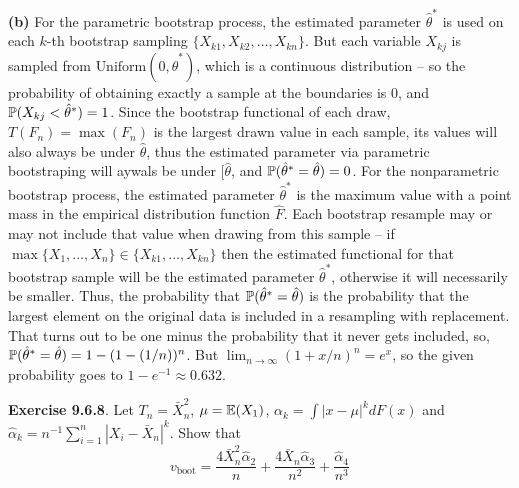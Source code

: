 \textbf{(b)}
For the parametric bootstrap process, the estimated parameter
\(\hat{\theta}^{*}\) is used on each \(k\)-th bootstrap sampling
\(\{ X_{k1}, X_{k2}, \dots, X_{kn} \}\). But each variable \(X_{kj}\) is
sampled from \(\text{Uniform}(0, \hat{\theta}^{*})\), which is a
continuous distribution -- so the probability of obtaining exactly a
sample at the boundaries is 0, and
\(\operatorname{\mathbb{P}}(X_{kj} < \hat{\theta}^{*}) = 1\). Since the bootstrap
functional of each draw, \(T(F_{n}) = \max(F_{n})\) is the largest drawn
value in each sample, its values will also always be under
\(\hat{\theta}\), thus the estimated parameter via parametric
bootstraping will aywals be under \([\hat{\theta}\), and
\(\operatorname{\mathbb{P}}(\hat{\theta}^{*} = \hat{\theta}) = 0\).
For the nonparametric bootstrap process, the estimated parameter
\(\hat{\theta}^{*}\) is the maximum value with a point mass in the
empirical distribution function \(\hat{F}\). Each bootstrap resample may
or may not include that value when drawing from this sample -- if
\(\max\{X_{1}, \dots, X_{n}\} \in \{X_{k1}, \dots, X_{kn} \}\) then the
estimated functional for that bootstrap sample will be the estimated
parameter \(\hat{\theta}^{*}\), otherwise it will necessarily be smaller.
Thus, the probability that \(\operatorname{\mathbb{P}}(\hat{\theta}^{*} = \hat{\theta})\)
is the probability that the largest element on the original data is
included in a resampling with replacement. That turns out to be one
minus the probability that it never gets included, so,
\(\operatorname{\mathbb{P}}(\hat{\theta}^{*} = \hat{\theta}) = 1 - (1 - (1/n))^{n}\). But
\(\lim_{n \rightarrow \infty } (1 + x/n)^{n} = e^x\), so the given
probability goes to \(1 - e^{-1} \approx 0.632\).

\textbf{Exercise 9.6.8}. Let \(T_{n} = \bar{X}_{n}^{2}\),
\(\mu = \operatorname{\mathbb{E}}(X_{1})\), \(\alpha_{k} = \int |x - \mu|^{k} dF(x)\) and
\(\hat{\alpha}_{k} = n^{-1} \sum_{i=1}^{n} |X_{i} - \bar{X}_{n}|^{k}\). Show
that
\[
v_\text{boot} = \frac{4 \bar{X}_{n}^{2} \hat{\alpha}_{2}}{n} + \frac{4 \bar{X}_{n} \hat{\alpha}_{3}}{n^{2}} + \frac{\hat{\alpha}_{4}}{n^{3}}
\]

